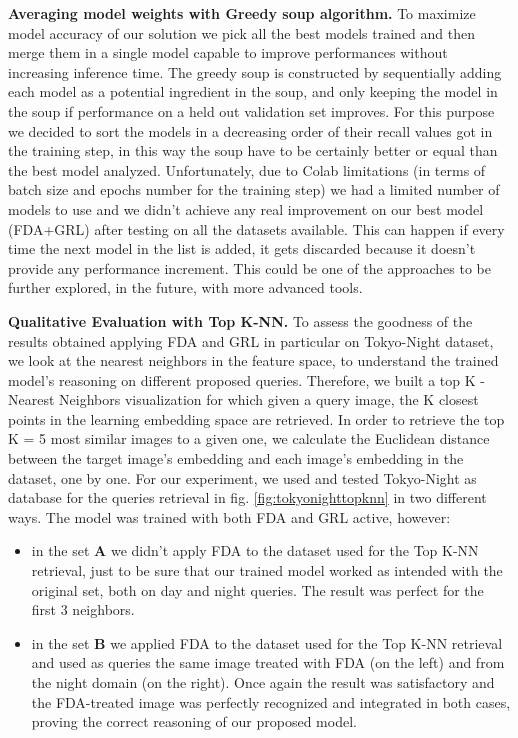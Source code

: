 \documentclass[10pt,twocolumn,letterpaper]{article}
\begin{document}
\textbf{Averaging model weights with Greedy soup algorithm.}
To maximize model accuracy of our solution we pick all the best models trained and then merge them in a single model capable to improve performances without increasing inference time.
The greedy soup is constructed by sequentially adding each model as a potential ingredient in the soup, and only keeping the model in the soup if performance on a held out validation set improves.
For this purpose we decided to sort the models in a decreasing order of their recall values got in the training step, in this way the soup have to be certainly better or equal than the best model analyzed. 
Unfortunately, due to Colab limitations (in terms of batch size and epochs number for the training step) we had a limited number of models to use and we didn't achieve any real improvement on our best model (FDA+GRL) after testing on all the datasets available. This can happen if every time the next model in the list is added, it gets discarded because it doesn't provide any performance increment. This could be one of the approaches to be further explored, in the future, with more advanced tools. 
\newline

\textbf{Qualitative Evaluation with Top K-NN.}
To assess the goodness of the results obtained applying FDA and GRL in particular on Tokyo-Night dataset, we look at the nearest neighbors in the feature space, to understand the trained model's reasoning on different proposed queries. 
Therefore, we built a top K - Nearest Neighbors visualization
for which given a query image, the K closest points in the learning embedding space are retrieved.
In order to retrieve the top K = 5 most similar images to a given one, we calculate the Euclidean distance between the target image's embedding and each image's embedding in the dataset, one by one.
For our experiment, we used and tested Tokyo-Night as database for the queries retrieval in fig. \cref{fig:tokyonighttopknn} in two different ways.
The model was trained with both FDA and GRL active, however:
\begin{itemize}
    \item in the set \textbf{A} we didn't apply FDA to the dataset used for the Top K-NN retrieval, just to be sure that our trained model worked as intended with the original set, both on day and night queries. The result was perfect for the first 3 neighbors.
    \item in the set \textbf{B} we applied FDA to the dataset used for the Top K-NN retrieval and used as queries the same image treated with FDA (on the left) and from the night domain (on the right).
    Once again the result was satisfactory and the FDA-treated image was perfectly recognized and integrated in both cases, proving the correct reasoning of our proposed model.
\end{itemize}
\end{document}
